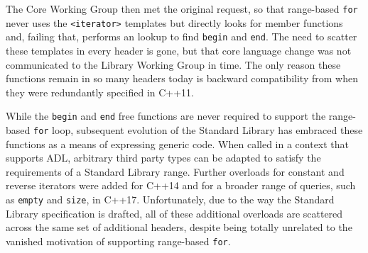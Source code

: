 The Core Working Group then met the original request, so that
range-based \lstinline!for! never uses the \lstinline!<iterator>! templates
but directly looks for member functions and, failing that, performs an
 lookup to find \lstinline!begin! and \lstinline!end!. The need to
scatter these templates in every header is gone, but that core language
change was not communicated to the Library Working Group in time. The
only reason these functions remain in so many headers today is backward
compatibility from when they were redundantly specified in C++11.

While the \lstinline!begin! and \lstinline!end! free functions are never
required to support the range-based \lstinline!for! loop, subsequent
evolution of the Standard Library has embraced these functions as a
means of expressing generic code. When called in a context that supports
ADL, arbitrary third party types can be adapted to satisfy the
requirements of a Standard Library range. Further overloads for constant
and reverse iterators were added for C++14 and for a broader range of
queries, such as \lstinline!empty! and \lstinline!size!, in C++17.
Unfortunately, due to the way the Standard Library specification is
drafted, all of these additional overloads are scattered across the same
set of additional headers, despite being totally unrelated to the
vanished motivation of supporting range-based \lstinline!for!.


